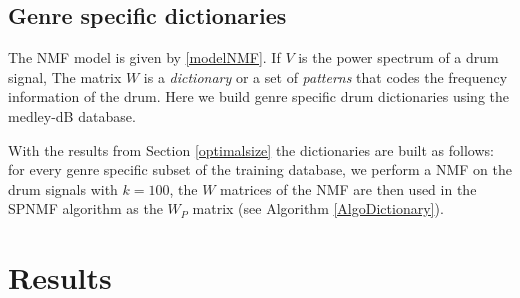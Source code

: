 \documentclass{article}
\begin{document}
\subsection{Genre specific dictionaries}\label{genrespecdict}

The NMF model is given by \eqref{modelNMF}. If $V$ is the power spectrum of a drum signal, The matrix $W$ is a {\em dictionary} or a set of {\em patterns} that codes the frequency information of the drum. Here we build genre specific drum dictionaries using the medley-dB database. %

With the results from Section \ref{optimalsize} the dictionaries are built as follows: for every genre specific subset of the training database, we perform a NMF on the drum signals with $k=100$,  the $W$ matrices of the NMF are then used in the SPNMF algorithm as the  $W_P$ matrix (see Algorithm \ref{AlgoDictionary}).

%   
%  


\section{Results}\label{sec:results}
\end{document}
